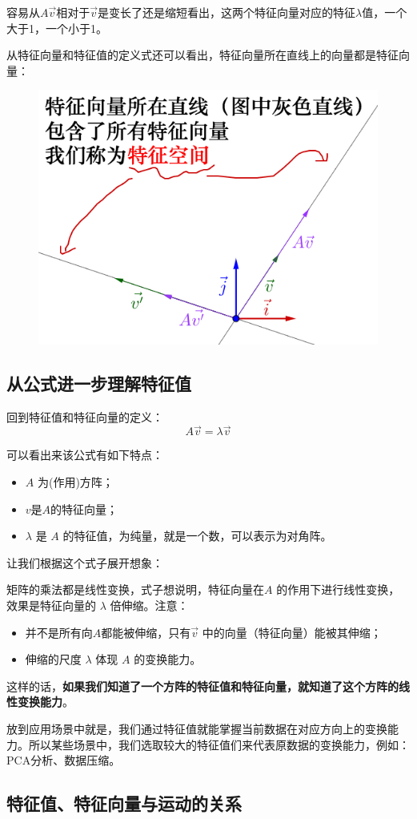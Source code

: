 \documentclass[12pt]{article}
\begin{document}
容易从$A\vec{v_{}}$相对于$\vec{v_{}}$是变长了还是缩短看出，这两个特征向量对应的特征$\lambda$值，一个大于1，一个小于1。

从特征向量和特征值的定义式还可以看出，特征向量所在直线上的向量都是特征向量：
\begin{figure}[H]
    \centering
    \includegraphics[width=.3\textwidth]{fig/UnderstandEigenValueVector_6.png}
\end{figure} 

\subsection{从公式进一步理解特征值\cite{Eigen_Value_And_Sigular_Value}}
回到特征值和特征向量的定义：$$
A\vec{v} = \lambda\vec{v}
$$

可以看出来该公式有如下特点：
\begin{itemize}
    \item $A$ 为(作用)方阵；
    \item $v$是$A$的特征向量；
    \item $\lambda$ 是 $A$ 的特征值，为纯量，就是一个数，可以表示为对角阵。
\end{itemize}

让我们根据这个式子展开想象：

矩阵的乘法都是线性变换，式子想说明，特征向量在$A$ 的作用下进行线性变换，效果是特征向量的 $\lambda$ 倍伸缩。注意：

\begin{itemize}
    \item 并不是所有向$A$都能被伸缩，只有$\vec{v}$ 中的向量（特征向量）能被其伸缩；
    \item 伸缩的尺度 $\lambda$ 体现 $A$ 的变换能力。
\end{itemize}

这样的话，\textbf{如果我们知道了一个方阵的特征值和特征向量，就知道了这个方阵的线性变换能力}。

放到应用场景中就是，我们通过特征值就能掌握当前数据在对应方向上的变换能力。所以某些场景中，我们选取较大的特征值们来代表原数据的变换能力，例如：PCA分析、数据压缩。

\subsection{特征值、特征向量与运动的关系}
\end{document}
